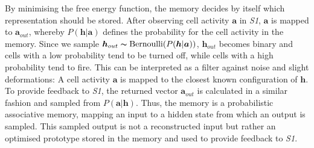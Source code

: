 By minimising the free energy function, the memory decides by itself which representation should be stored.
After observing cell activity $\boldsymbol{a}$ in \emph{S1}, $\boldsymbol{a}$ is mapped to $\boldsymbol{a}_{out}$, whereby $P(\boldsymbol{h}|\boldsymbol{a})$ defines the probability for the cell activity in the memory. Since we sample $\boldsymbol{h}_{out} \thicksim \text{Bernoulli}(P(\boldsymbol{h} | \boldsymbol{a}) )$, $\boldsymbol{h}_{out}$ becomes binary and cells with a low probability tend to be turned off, while cells with a high probability tend to fire.
This can be interpreted as a filter against noise and slight deformations: A cell activity $\boldsymbol{a}$ is mapped to the closest known configuration of $\boldsymbol{h}$.
To provide feedback to \emph{S1}, the returned vector $\boldsymbol{a}_{out}$ is calculated in a similar fashion and sampled from $P(\boldsymbol{a}|\boldsymbol{h})$. Thus, the memory is a probabilistic associative memory, mapping an input to a hidden state from which an output is sampled.
This sampled output is not a reconstructed input but rather an optimised prototype stored in the memory and used to provide feedback to \emph{S1}.





